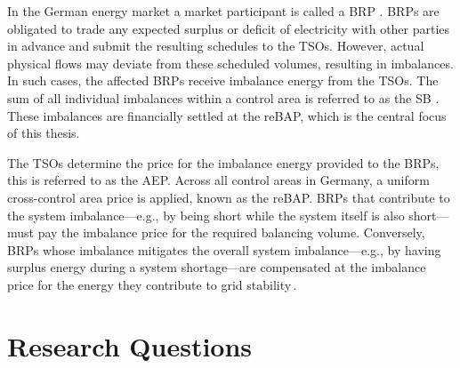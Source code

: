 \documentclass[class=scrbook, crop=false]{standalone}
\begin{document}
In the German energy market a market participant is called a \gls{BRP} \cite{narajewskiProbabilisticForecastingGerman2022}. 
\gls{BRP}s are obligated to trade any expected surplus or deficit of electricity with other parties in advance and submit the resulting schedules to the \gls{TSO}s. 
However, actual physical flows may deviate from these scheduled volumes, resulting in imbalances. 
In such cases, the affected \gls{BRP}s receive imbalance energy from the \gls{TSO}s.
The sum of all individual imbalances within a control area is referred to as the \gls{SB} \cite{eickeElectricityBalancingMarket2021}.
These imbalances are financially settled at the \gls{reBAP}, which is the central focus of this thesis.

The \gls{TSO}s determine the price for the imbalance energy provided to the \gls{BRP}s, this is referred to as the \gls{AEP}. Across all control areas in Germany, a uniform cross-control area price is applied, known as the \gls{reBAP}.
\gls{BRP}s that contribute to the system imbalance—e.g., by being short while the system itself is also short—must pay the imbalance price for the required balancing volume. Conversely, \gls{BRP}s whose imbalance mitigates the overall system imbalance—e.g., by having surplus energy during a system shortage—are compensated at the imbalance price for the energy they contribute to grid stability \cite{eickeElectricityBalancingMarket2021}.


\section{Research Questions}
\label{Section::Research_Questions}
\end{document}
